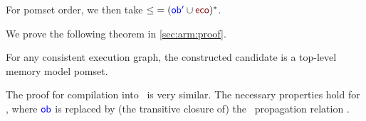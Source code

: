 For pomset order, we then take ${\gtN}=({\robi}\cup{\reco})^*$.

We prove the following theorem in \textsection\ref{sec:arm:proof}.
\begin{theorem}
  For any consistent \armeight{} execution graph, the constructed candidate
  is a top-level memory model pomset.
\end{theorem}

The proof for compilation into \tso\ is very similar.  The necessary
properties hold for \tso, where $\mathrel{\textcolor{blue}{\mathsf{ob}}}$ is replaced by (the transitive closure
of) the \tso\ propagation relation \citep{alglave}.


